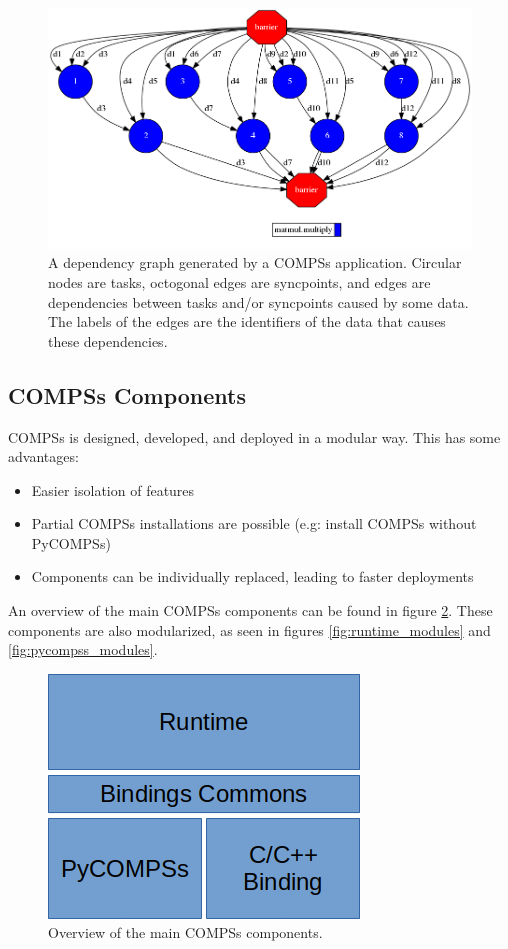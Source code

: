 \begin{figure}[ht!]
\centering
\includegraphics[scale = 0.45]{figures/2x2_matmul_graph.png}
\caption{A dependency graph generated by a COMPSs application. Circular nodes are tasks, octogonal edges are syncpoints, and edges are dependencies between tasks and/or syncpoints caused by some data. The labels of the edges are the identifiers of the data that causes these dependencies.}
\label{fig:graph_example}
\end{figure}



\subsection{COMPSs Components}
\label{subsec:compss_components}
COMPSs is designed, developed, and deployed in a modular way. This has some advantages:
\begin{itemize} 
\item Easier isolation of features
\item Partial COMPSs installations are possible (e.g: install COMPSs without PyCOMPSs)
\item Components can be individually replaced, leading to faster deployments
\end{itemize}
An overview of the main COMPSs components can be found in figure \ref{fig:compss_modules}. These components are also modularized, as seen in figures \ref{fig:runtime_modules} and \ref{fig:pycompss_modules}.
\begin{figure}
\centering
\includegraphics{figures/compss_modules.png}
\caption{Overview of the main COMPSs components.}
\label{fig:compss_modules}
\end{figure}

